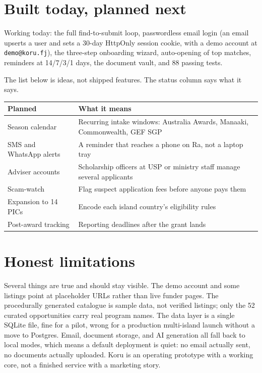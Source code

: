 \documentclass[11pt]{article}
\begin{document}
\section{Built today, planned next}

Working today: the full find-to-submit loop, passwordless email login (an email upserts a user and sets a 30-day HttpOnly session cookie, with a demo account at \texttt{demo@koru.fj}), the three-step onboarding wizard, auto-opening of top matches, reminders at 14/7/3/1 days, the document vault, and 88 passing tests.

The list below is ideas, not shipped features. The status column says what it says.

\begin{table}[h]
\centering
\begin{tabular}{@{}ll@{}}
\toprule
Planned & What it means \\
\midrule
Season calendar & Recurring intake windows: Australia Awards, Manaaki, Commonwealth, GEF SGP \\
SMS and WhatsApp alerts & A reminder that reaches a phone on Ra, not a laptop tray \\
Adviser accounts & Scholarship officers at USP or ministry staff manage several applicants \\
Scam-watch & Flag suspect application fees before anyone pays them \\
Expansion to 14 PICs & Encode each island country's eligibility rules \\
Post-award tracking & Reporting deadlines after the grant lands \\
\bottomrule
\end{tabular}
\end{table}

\section{Honest limitations}

Several things are true and should stay visible. The demo account and some listings point at placeholder URLs rather than live funder pages. The procedurally generated catalogue is sample data, not verified listings; only the 52 curated opportunities carry real program names. The data layer is a single SQLite file, fine for a pilot, wrong for a production multi-island launch without a move to Postgres. Email, document storage, and AI generation all fall back to local modes, which means a default deployment is quiet: no email actually sent, no documents actually uploaded. Koru is an operating prototype with a working core, not a finished service with a marketing story.
\end{document}
